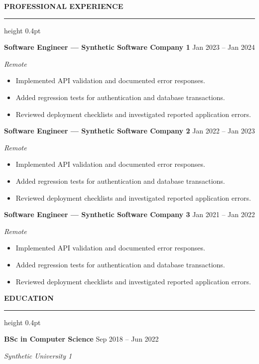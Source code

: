 \documentclass[10pt,letterpaper]{article}
\newcommand{\atsSectionToSection}{9pt}
\newcommand{\atsHeadingToContent}{3pt}
\newcommand{\atsEntryToEntry}{5pt}
\newcommand{\atsRoleToMetadata}{1.5pt}
\newcommand{\atsMetadataToBullets}{2.5pt}
\newcommand{\atsBulletToBullet}{1.2pt}
\newcommand{\atssection}[1]{%
  \vspace{\atsSectionToSection}%
  {\noindent\large\bfseries\uppercase{#1}}\par
  \vspace{1.5pt}\hrule height 0.4pt\vspace{\atsHeadingToContent}%
}
\begin{document}
\atssection{Professional Experience}
\textbf{Software Engineer — Synthetic Software Company 1} \hfill Jan 2023 -- Jan 2024\par
\vspace{\atsRoleToMetadata}
{\small\textit{Remote}}\par
\vspace{\atsMetadataToBullets}
\begin{itemize}
\setlength{\itemsep}{\atsBulletToBullet}\setlength{\parskip}{0pt}\setlength{\parsep}{0pt}\setlength{\topsep}{0pt}\setlength{\partopsep}{0pt}
  \item Implemented API validation and documented error responses.
  \item Added regression tests for authentication and database transactions.
  \item Reviewed deployment checklists and investigated reported application errors.
\end{itemize}
\vspace{\atsEntryToEntry}
\textbf{Software Engineer — Synthetic Software Company 2} \hfill Jan 2022 -- Jan 2023\par
\vspace{\atsRoleToMetadata}
{\small\textit{Remote}}\par
\vspace{\atsMetadataToBullets}
\begin{itemize}
\setlength{\itemsep}{\atsBulletToBullet}\setlength{\parskip}{0pt}\setlength{\parsep}{0pt}\setlength{\topsep}{0pt}\setlength{\partopsep}{0pt}
  \item Implemented API validation and documented error responses.
  \item Added regression tests for authentication and database transactions.
  \item Reviewed deployment checklists and investigated reported application errors.
\end{itemize}
\vspace{\atsEntryToEntry}
\textbf{Software Engineer — Synthetic Software Company 3} \hfill Jan 2021 -- Jan 2022\par
\vspace{\atsRoleToMetadata}
{\small\textit{Remote}}\par
\vspace{\atsMetadataToBullets}
\begin{itemize}
\setlength{\itemsep}{\atsBulletToBullet}\setlength{\parskip}{0pt}\setlength{\parsep}{0pt}\setlength{\topsep}{0pt}\setlength{\partopsep}{0pt}
  \item Implemented API validation and documented error responses.
  \item Added regression tests for authentication and database transactions.
  \item Reviewed deployment checklists and investigated reported application errors.
\end{itemize}

\atssection{Education}
\textbf{BSc in Computer Science} \hfill Sep 2018 -- Jun 2022\par
\vspace{\atsRoleToMetadata}
{\small\textit{Synthetic University 1}}\par
\end{document}
